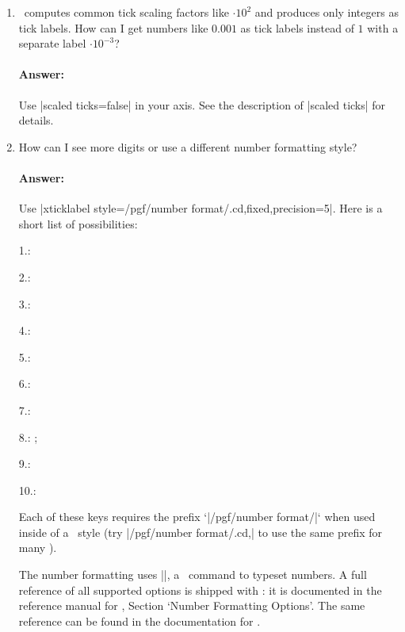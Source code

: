 \begin{enumerate}
	\item \PGFPlots\ computes common tick scaling factors like $\cdot 10^2$ and produces only integers as tick labels.
	How can I get numbers like $0.001$ as tick labels instead of $1$ with a separate label $\cdot 10^{-3}$?

	\paragraph{Answer:} Use |scaled ticks=false| in your axis. See the description of |scaled ticks| for details.

	\item How can I see more digits or use a different number formatting style?

	\paragraph{Answer:} Use |xticklabel style={/pgf/number format/.cd,fixed,precision=5}|. Here is a short list of possibilities:
\begin{codeexample}[vbox]
1.: 

2.: 

3.: 

4.: 

5.: 

6.: 

7.: 

8.: ; 

9.: 

10.: 

\end{codeexample}
	\noindent Each of these keys requires the prefix `|/pgf/number format/|` when used inside of a \PGFPlots\ style (try |/pgf/number format/.cd,| to use the same prefix for many ).

	The number formatting uses |\pgfmathprintnumber|, a \pgfname\ command to typeset numbers. A full reference of all supported options is shipped with \PGFPlots: it is documented in the reference manual for \PGFPlotstable, Section `Number Formatting Options'. The same reference can be found in the documentation for \pgfname.


\end{enumerate}
